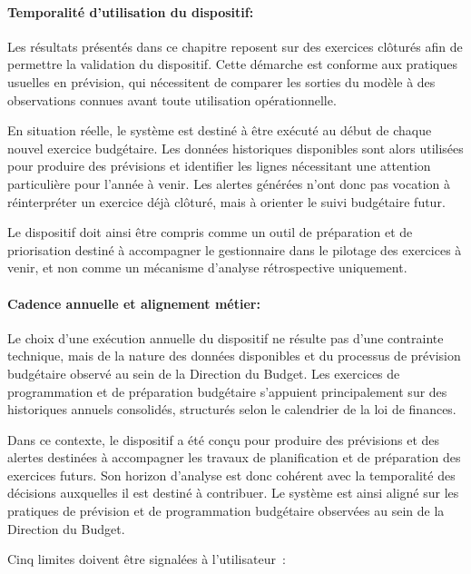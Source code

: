 \paragraph{Temporalit\'e d'utilisation du dispositif:}
Les r\'esultats pr\'esent\'es dans ce chapitre reposent sur des
exercices cl\^otur\'es afin de permettre la validation du dispositif.
Cette d\'emarche est conforme aux pratiques usuelles en pr\'evision, qui
n\'ecessitent de comparer les sorties du mod\`ele \`a des observations
connues avant toute utilisation op\'erationnelle.

En situation r\'eelle, le syst\`eme est destin\'e \`a \^etre ex\'ecut\'e
au d\'ebut de chaque nouvel exercice budg\'etaire. Les donn\'ees
historiques disponibles sont alors utilis\'ees pour produire des
pr\'evisions et identifier les lignes n\'ecessitant une attention
particuli\`ere pour l'ann\'ee \`a venir. Les alertes g\'en\'er\'ees n'ont
donc pas vocation \`a r\'einterpr\'eter un exercice d\'ej\`a cl\^otur\'e,
mais \`a orienter le suivi budg\'etaire futur.

Le dispositif doit ainsi \^etre compris comme un outil de pr\'eparation
et de priorisation destin\'e \`a accompagner le gestionnaire dans le
pilotage des exercices \`a venir, et non comme un m\'ecanisme d'analyse
r\'etrospective uniquement.

\paragraph{Cadence annuelle et alignement m\'etier:}
Le choix d'une ex\'ecution annuelle du dispositif ne r\'esulte pas d'une
contrainte technique, mais de la nature des donn\'ees disponibles et du
processus de pr\'evision budg\'etaire observ\'e au sein de la Direction
du Budget. Les exercices de programmation et de pr\'eparation
budg\'etaire s'appuient principalement sur des historiques annuels
consolid\'es, structur\'es selon le calendrier de la loi de finances.

Dans ce contexte, le dispositif a \'et\'e con\c{c}u pour produire des
pr\'evisions et des alertes destin\'ees \`a accompagner les travaux de
planification et de pr\'eparation des exercices futurs. Son horizon
d'analyse est donc coh\'erent avec la temporalit\'e des d\'ecisions
auxquelles il est destin\'e \`a contribuer. Le syst\`eme est ainsi
align\'e sur les pratiques de pr\'evision et de programmation
budg\'etaire observ\'ees au sein de la Direction du Budget.

\medskip

Cinq limites doivent \^etre signal\'ees \`a l'utilisateur~:

